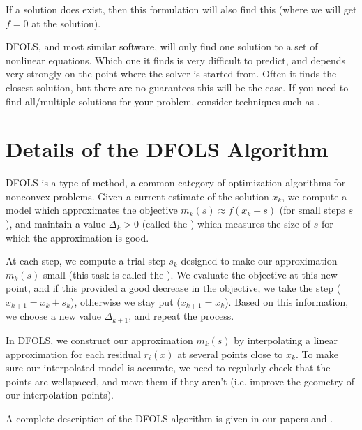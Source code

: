 \documentclass[letterpaper,10pt,english]{sphinxmanual}
\begin{document}
\sphinxAtStartPar
If a solution does exist, then this formulation will also find this (where we will get \(f=0\) at the solution).

\sphinxAtStartPar
{} DFO\sphinxhyphen{}LS, and most similar software, will only find one solution to a set of nonlinear equations. Which one it finds is very difficult to predict, and depends very strongly on the point where the solver is started from. Often it finds the closest solution, but there are no guarantees this will be the case. If you need to find all/multiple solutions for your problem, consider techniques such as .


\section{Details of the DFO\sphinxhyphen{}LS Algorithm}
\label{\detokenize{info:details-of-the-dfo-ls-algorithm}}
\sphinxAtStartPar
DFO\sphinxhyphen{}LS is a type of  method, a common category of optimization algorithms for nonconvex problems. Given a current estimate of the solution \(x_k\), we compute a model which approximates the objective \(m_k(s)\approx f(x_k+s)\) (for small steps \(s\)), and maintain a value \(\Delta_k>0\) (called the ) which measures the size of \(s\) for which the approximation is good.

\sphinxAtStartPar
At each step, we compute a trial step \(s_k\) designed to make our approximation \(m_k(s)\) small (this task is called the ). We evaluate the objective at this new point, and if this provided a good decrease in the objective, we take the step (\(x_{k+1}=x_k+s_k\)), otherwise we stay put (\(x_{k+1}=x_k\)). Based on this information, we choose a new value \(\Delta_{k+1}\), and repeat the process.

\sphinxAtStartPar
In DFO\sphinxhyphen{}LS, we construct our approximation \(m_k(s)\) by interpolating a linear approximation for each residual \(r_i(x)\) at several points close to \(x_k\). To make sure our interpolated model is accurate, we need to regularly check that the points are well\sphinxhyphen{}spaced, and move them if they aren’t (i.e. improve the geometry of our interpolation points).

\sphinxAtStartPar
A complete description of the DFO\sphinxhyphen{}LS algorithm is given in our papers  and .
\end{document}
